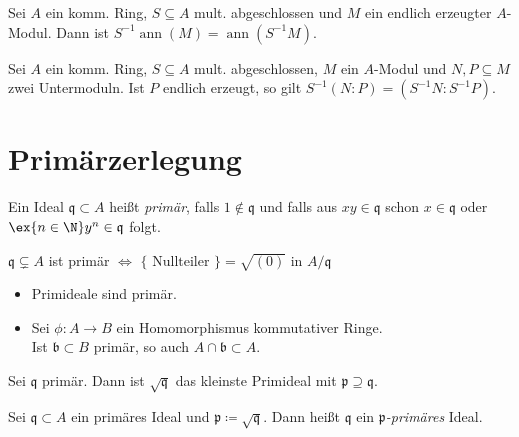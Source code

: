 \documentclass{cheat-sheet}
\DeclareMathOperator{\ann}{ann} %
\newcommand{\bbb}{\mathfrak{b}}
\newcommand{\ppp}{\mathfrak{p}}
\newcommand{\qqq}{\mathfrak{q}}
\begin{document}

\begin{prop}
  Sei $A$ ein komm. Ring, $S \subseteq A$ mult. abgeschlossen und $M$ ein endlich erzeugter $A$-Modul.
  Dann ist $S^{-1} \ann(M) = \ann(S^{-1} M)$.
\end{prop}

\begin{kor}
  Sei $A$ ein komm. Ring, $S \subseteq A$ mult. abgeschlossen, $M$ ein $A$-Modul und $N, P \subseteq M$ zwei Untermoduln.
  Ist $P$ endlich erzeugt, so gilt $S^{-1} (N : P) = (S^{-1} N : S^{-1} P)$.
\end{kor}

\section{Primärzerlegung}



\begin{defn}
  Ein Ideal $\qqq \subset A$ heißt \emph{primär}, falls $1 \not\in \qqq$ und falls aus $x y \in \qqq$ schon $x \in \qqq$ oder $\ex{n \in \N} y^n \in \qqq$ folgt.
\end{defn}

\begin{lem}
  $\qqq \subsetneq A$ ist primär $\iff$ $\{ \text{ Nullteiler } \} = \sqrt{(0)}$ in $A/\qqq$
\end{lem}

\begin{bspe}
  \begin{itemize}
    \item Primideale sind primär.
    \item Sei $\phi : A \to B$ ein Homomorphismus kommutativer Ringe. \\
    Ist $\bbb \subset B$ primär, so auch $A \cap \bbb \subset A$.
  \end{itemize}
\end{bspe}

\begin{lem}
  Sei $\qqq$ primär.
  Dann ist $\sqrt{\qqq}$ das kleinste Primideal mit $\ppp \supseteq \qqq$.
\end{lem}

\begin{defn}
  Sei $\qqq \subset A$ ein primäres Ideal und $\ppp \coloneqq \sqrt{\qqq}$.
  Dann heißt $\qqq$ ein \emph{$\ppp$-primäres} Ideal.
\end{defn}
\end{document}
